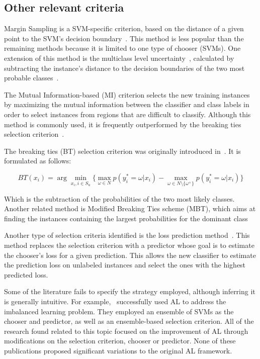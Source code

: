 \documentclass[preprint,12pt]{elsarticle}
\begin{document}
\subsection{Other relevant criteria}

Margin Sampling is a SVM-specific criterion, based on the distance of a given
point to the SVM's decision boundary~\cite{Shrivastava2021}. This method is
less popular than the remaining methods because it is limited to one type of
chooser (SVMs). One extension of this method is the multiclass level
uncertainty~\cite{Shrivastava2021}, calculated by subtracting the instance's
distance to the decision boundaries of the two most probable
classes~\cite{Demir2011}.

The Mutual Information-based (MI) criterion selects the new training instances
by maximizing the mutual information between the classifier and class labels
in order to select instances from regions that are difficult to classify.
Although this method is commonly used, it is frequently outperformed by the
breaking ties selection criterion~\cite{Li2011,Liu2018}.

The breaking ties (BT) selection criterion was originally introduced
in~\cite{Luo2003}. It is formulated as follows:

\begin{equation}\label{eq:breaking_ties}
    BT(x_i) = \arg \min_{x_i, i \in S_u}\{ \max_{\omega \in N}{p(y_{i}^{*}=\omega|x_i)} -
    \max_{\omega \in N\setminus\{\omega^{+}\}}{p(y_{i}^{*}=\omega|x_i)}\}
\end{equation}

Which is the subtraction of the probabilities of the two most likely classes.
Another related method is Modified Breaking Ties scheme (MBT), which aims at
finding the instances containing the largest probabilities for the dominant
class~\cite{Liu2018,Li2013a}

Another type of selection criteria identified is the loss prediction
method~\cite{Yoo2019}. This method replaces the selection criterion with a
predictor whose goal is to estimate the chooser's loss for a given
prediction. This allows the new classifier to estimate the prediction loss on
unlabeled instances and select the ones with the highest predicted loss.

Some of the literature fails to specify the strategy employed, although
inferring it is generally intuitive. For example,~\cite{Ertekin2007}
successfully used AL to address the imbalanced learning problem. They employed
an ensemble of SVMs as the chooser and predictor, as well as an ensemble-based
selection criterion. All of the research found related to this topic focused on
the improvement of AL through modifications on the selection criterion, chooser
or predictor. None of these publications proposed significant variations to the
original AL framework.
\end{document}
